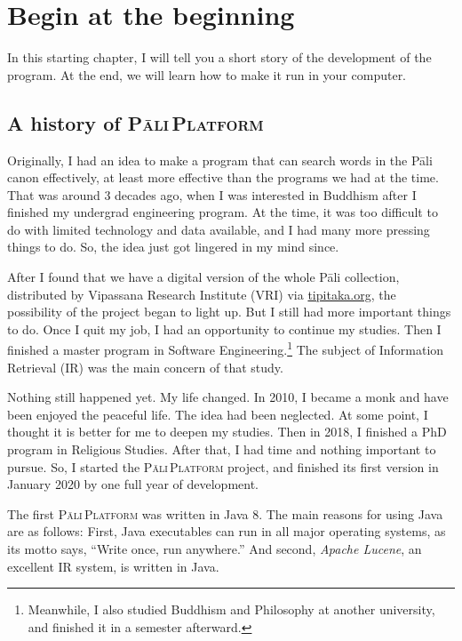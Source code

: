 \chapter{Begin at the beginning}

In this starting chapter, I will tell you a short story of the development of the program. At the end, we will learn how to make it run in your computer.

\section{A history of \textsc{Pāli\,Platform}}

Originally, I had an idea to make a program that can search words in the Pāli canon effectively, at least more effective than the programs we had at the time. That was around 3 decades ago, when I was interested in Buddhism after I finished my undergrad engineering program. At the time, it was too difficult to do with limited technology and data available, and I had many more pressing things to do. So, the idea just got lingered in my mind since.

After I found that we have a digital version of the whole Pāli collection, distributed by Vipassana Research Institute (VRI) via \url{tipitaka.org}, the possibility of the project began to light up. But I still had more important things to do. Once I quit my job, I had an opportunity to continue my studies. Then I finished a master program in Software Engineering.\footnote{Meanwhile, I also studied Buddhism and Philosophy at another university, and finished it in a semester afterward.} The subject of Information Retrieval (IR) was the main concern of that study.

Nothing still happened yet. My life changed. In 2010, I became a monk and have been enjoyed the peaceful life. The idea had been neglected. At some point, I thought it is better for me to deepen my studies. Then in 2018, I finished a PhD program in Religious Studies. After that, I had time and nothing important to pursue. So, I started the \textsc{Pāli\,Platform} project, and finished its first version in January 2020 by one full year of development.

The first \textsc{Pāli\,Platform} was written in Java 8. The main reasons for using Java are as follows: First, Java executables can run in all major operating systems, as its motto says, ``Write once, run anywhere.'' And second, \emph{Apache Lucene}, an excellent IR system, is written in Java.

